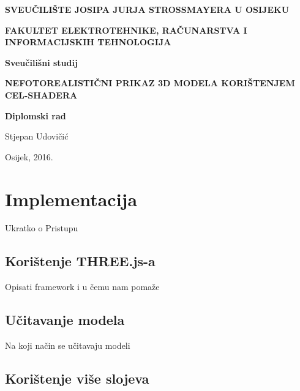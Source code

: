\documentclass[a4paper,12pt]{extarticle}
\begin{document}
\begin{titlepage}
	\centering
	{\bfseries SVEUČILIŠTE JOSIPA JURJA STROSSMAYERA U OSIJEKU\par}
	{\bfseries FAKULTET ELEKTROTEHNIKE, RAČUNARSTVA I INFORMACIJSKIH TEHNOLOGIJA\par}
	
	\vspace{2cm}
	{\bfseries Sveučilišni studij\par}

	\vspace{4cm}
	{\huge\bfseries NEFOTOREALISTIČNI PRIKAZ 3D MODELA KORIŠTENJEM CEL-SHADERA\par}
	
	\vspace{1cm}
	{\bfseries Diplomski rad\par}
	
	\vspace{2cm}
	{\Large Stjepan Udovičić\par}
	
	\vfill
	{Osijek, 2016.\par}
\end{titlepage}

\tableofcontents









\section{Implementacija}

Ukratko o Pristupu

\subsection{Korištenje THREE.js-a}

Opisati framework i u čemu nam pomaže

\subsection{Učitavanje modela}

Na koji način se učitavaju modeli

\subsection{Korištenje više slojeva}
\end{document}
